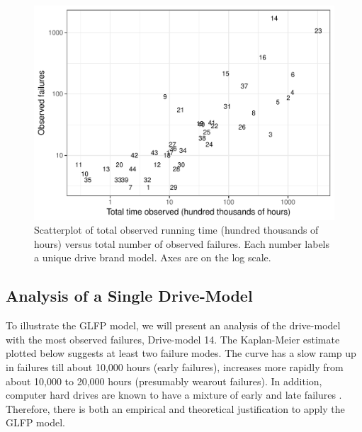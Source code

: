 \documentclass[12pt]{article}
\begin{document}
\begin{figure}[H]
  \includegraphics[width=.9\textwidth]{dm-summ-scatter.pdf}
  \caption{Scatterplot of total observed running time (hundred thousands of hours) versus total number of observed failures.  Each number labels a unique drive brand model.   Axes are on the log scale.}
  \label{drive-scatter}
\end{figure}

\subsection{Analysis of a Single Drive-Model}
\label{subsec:ex1}
To illustrate the GLFP model, we will present an analysis of the drive-model with the most observed failures, Drive-model 14.  The Kaplan-Meier estimate plotted below suggests at least two failure modes.  The curve has a slow ramp up in failures till about 10,000 hours (early failures), increases more rapidly from about 10,000 to 20,000 hours (presumably wearout failures).  In addition, computer hard drives are known to have a mixture of early and late failures \citep{chan}.  Therefore, there is both an empirical and theoretical justification to apply the GLFP model.
\end{document}
